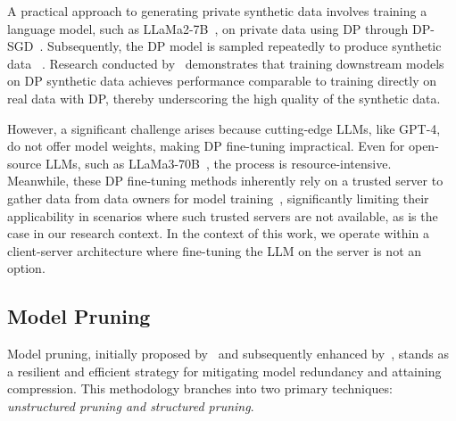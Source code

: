 A practical approach to generating private synthetic data involves training a language model, such as LLaMa2-7B~\cite{touvron2023llama}, on private data using DP through DP-SGD~\cite{song2013stochastic,bassily2014private,abadi2016deep}. Subsequently, the DP model is sampled repeatedly to produce synthetic data ~\cite{mattern2022differentially,yue2022synthetic,kurakin2023harnessing}. 
Research conducted by~\cite{mattern2022differentially,yue2022synthetic,kurakin2023harnessing} demonstrates that training downstream models on DP synthetic data achieves performance comparable to training directly on real data with DP, thereby underscoring the high quality of the synthetic data.

However, a significant challenge arises because cutting-edge LLMs, like GPT-4, do not offer model weights, making DP fine-tuning impractical. Even for open-source LLMs, such as LLaMa3-70B~\cite{touvron2023llama}, the process is resource-intensive. 
Meanwhile, these DP fine-tuning methods inherently rely on a trusted server to gather data from data owners for model training~\cite{chen-etal-2023-customized}, significantly limiting their applicability in scenarios where such trusted servers are not available, as is the case in our research context.
In the context of this work, we operate within a client-server architecture where fine-tuning the LLM on the server is not an option. 



\subsection{Model Pruning}

Model pruning, initially proposed by~\cite{lecun1989optimal} and subsequently enhanced by~\cite{han2015learning}, stands as a resilient and efficient strategy for mitigating model redundancy and attaining compression. This methodology branches into two primary techniques: \textit{unstructured pruning and structured pruning}.


